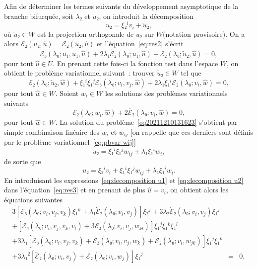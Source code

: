 \documentclass{article}
\begin{document}
Afin de déterminer les termes suivants du développement asymptotique
de la branche bifurquée, soit $λ₂$ et $u₂$, on introduit la
décomposition
\begin{equation}
  u₂ = ξ₂^i v_i + \tilde{u}₂,
\end{equation}
où $\tilde{u}₂∈W$ est la projection orthogonale de $u₂$ sur
$W$(notation provisoire). On a alors $ℰ₂ (u₂, \hat{u})
=ℰ₂ (\tilde{u}₂, \hat{u})$ et l'équation~\eqref{eq:res2}
s'écrit
\begin{equation}
  ℰ₃ (λ₀ ; u₁, u₁, \hat{u}) + 2 λ₁
  \dot{ℰ₂} (λ₀ ; u₁, \hat{u}) +ℰ₂ (λ₀ ;
  \tilde{u}₂, \hat{u}) = 0,
\end{equation}
pour tout $\hat{u}∈U$. En prenant cette fois-ci la fonction test dans
l'espace $W$, on obtient le problème variationnel suivant~: trouver
$\tilde{u}₂∈W$ tel que
\begin{equation}
  \label{eq20211210131623} ℰ₂ (λ₀ ; {\tilde{u}₂} , \hat{w})
  + ξ₁^i ξ₁^j ℰ₃ (λ₀ ; v_i, v_j, \hat{w}) + 2
  λ₁ ξ₁^i  \dot{ℰ₂} (λ₀ ; v_i, \hat{w}) = 0,
\end{equation}
pour tout $\hat{w}∈W$. Soient $w_i∈W$ les solutions des problèmes
variationnels suivants
\begin{equation}
  \label{eq:pbvar wi} ℰ₂ (λ₀ ; w_i, \hat{w}) + 2
  \dot{ℰ₂} (λ₀ ; v_i, \hat{w}) = 0,
\end{equation}
pour tout $\hat{w}∈W$. La solution du
problème~\eqref{eq20211210131623} s'obtient par simple combinaison
linéaire des $w_i$ et $w_{ij}$ [on rappelle que ces derniers sont
définis par le problème variationnel~\eqref{eq:pbvar wij}]
\begin{equation}
  \tilde{u}₂ = ξ₁^i ξ₁^j w_{i  j} + λ₁ ξ₁^i w_i,
\end{equation}
de sorte que
\begin{equation}
  \label{eq:decomposition u2} u₂ = ξ₂^i v_i + ξ₁^i ξ₁^j w_{i
   j} + λ₁ ξ₁^i w_i .
\end{equation}
En introduisant les expressions~\eqref{eq:decomposition u1} et
\eqref{eq:decomposition u2} dans l'équation~\eqref{eq:res3} et en prenant
de plus $\hat{u} = v_i$, on obtient alors les équations suivantes
\begin{eqnarray}
  3 [ℰ₃ (λ₀ ; v_i, v_j, v_k) ξ₁^k + λ₁
  \dot{ℰ}₂ (λ₀ ; v_i, v_j)] ξ₂^j + 3 λ₂
  \dot{ℰ}₂ (λ₀ ; v_i, v_j) ξ₁^j &  &  \nonumber\\
  + [ℰ₄ (λ₀ ; v_i, v_j, v_k, v_l) + 3ℰ₃
  (λ₀ ; v_i, v_j, w_{k  l})] ξ₁^j ξ₁^k ξ₁^l &  &
  \nonumber\\
  + 3 λ₁  [\dot{ℰ}₃ (λ₀ ; v_i, v_j, v_k)
  +ℰ₃ (λ₀ ; v_i, v_j, w_k) + \dot{ℰ₂} (λ₀
  ; v_i, w_{j  k})] ξ₁^j ξ₁^k &  &  \nonumber\\
  + 3 λ₁^2  [\ddot{ℰ}₂ (λ₀ ; v_i, v_j) +
  \dot{ℰ₂} (λ₀ ; v_i, w_j)] ξ₁^j & = & 0,
  \label{eq:bifurcation 2a}
\end{eqnarray}
\end{document}

